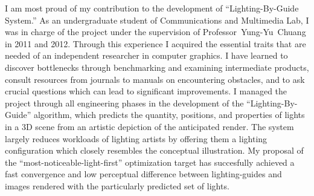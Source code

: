 \documentclass[a4paper, 11pt]{article}
\begin{document}


I am most proud of my contribution to the development of ``Lighting-By-Guide System.'' As an undergraduate student of Communications and Multimedia Lab, I was in charge of the project under the supervision of \mbox{Professor~Yung-Yu~Chuang} in 2011 and 2012. Through this experience I acquired the essential traits that are needed of an independent researcher in computer graphics. I have learned to discover bottlenecks through benchmarking and examining intermediate products, consult resources from journals to manuals on encountering obstacles, and to ask crucial questions which can lead to significant improvements. I managed the project through all engineering phases in the development of the ``Lighting-By-Guide'' algorithm, which predicts the quantity, positions, and properties of lights in a 3D scene from an artistic depiction of the anticipated render. The system largely reduces workloads of lighting artists by offering them a lighting configuration which closely resembles the conceptual illustration. My proposal of the ``most-noticeable-light-first'' optimization target has succesfully achieved a fast convergence and low perceptual difference between lighting-guides and images rendered with the particularly predicted set of lights.
 
\end{document}
